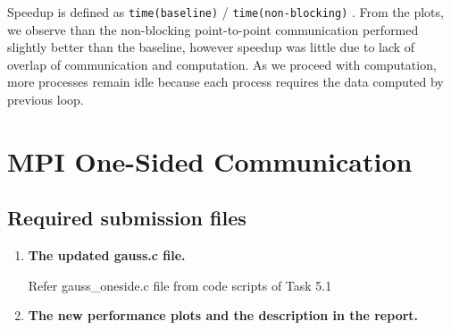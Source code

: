 \documentclass[10pt, letterpaper, twoside]{article}
\begin{document}
\begin{titlepage}
\begin{enumerate}
Speedup is defined as \verb!time(baseline)! / \verb!time(non-blocking)! . From the plots, we observe than the non-blocking point-to-point communication performed slightly better than the baseline, however speedup was little due to lack of overlap of communication and computation. As we proceed with computation, more processes remain idle because each process requires the data computed by previous loop.

\end{enumerate}

\section{MPI One-Sided Communication}

\subsection{Required submission files}

\begin{enumerate}
\item \textbf{The updated gauss.c file.} 

Refer gauss\_oneside.c file from code scripts of Task 5.1  

\item \textbf{The new performance plots and the description in the report.} 


\end{enumerate}
\end{titlepage}
\end{document}
